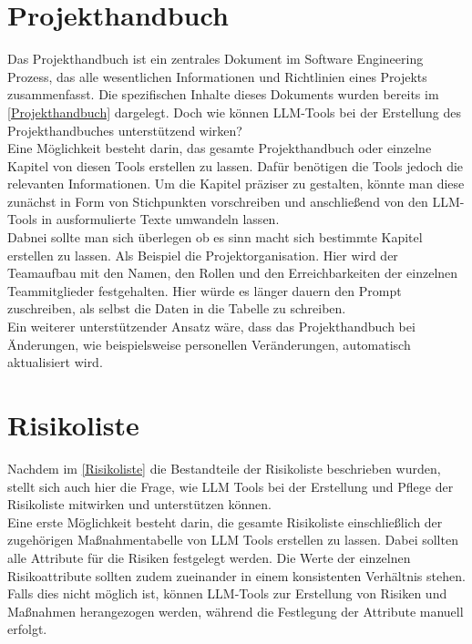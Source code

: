\section{Projekthandbuch}  \label{LLMProjekthandbuch}

Das Projekthandbuch ist ein zentrales Dokument im Software Engineering Prozess, das alle wesentlichen Informationen und 
Richtlinien eines Projekts zusammenfasst. Die spezifischen Inhalte dieses Dokuments wurden bereits im 
\autoref{Projekthandbuch} dargelegt. Doch wie können LLM-Tools bei der Erstellung des 
Projekthandbuches unterstützend wirken?\\

Eine Möglichkeit besteht darin, das gesamte Projekthandbuch oder einzelne Kapitel von diesen Tools erstellen zu 
lassen. Dafür benötigen die Tools jedoch die relevanten Informationen. Um die Kapitel präziser zu gestalten, könnte 
man diese zunächst in Form von Stichpunkten vorschreiben und anschließend von den LLM-Tools in ausformulierte Texte 
umwandeln lassen.\\
Dabnei sollte man sich überlegen ob es sinn macht sich bestimmte Kapitel erstellen zu lassen. Als Beispiel die 
Projektorganisation. Hier wird der Teamaufbau mit den Namen, den Rollen und den Erreichbarkeiten der einzelnen
Teammitglieder festgehalten. Hier würde es länger dauern den Prompt zuschreiben, als selbst die Daten in die 
Tabelle zu schreiben.\\

Ein weiterer unterstützender Ansatz wäre, dass das Projekthandbuch bei Änderungen, wie beispielsweise personellen 
Veränderungen, automatisch aktualisiert wird.

\section{Risikoliste}  \label{LLMRisikoliste}

Nachdem im \autoref{Risikoliste} die Bestandteile der Risikoliste beschrieben wurden, stellt sich auch hier die Frage, 
wie LLM Tools bei der Erstellung und Pflege der Risikoliste mitwirken und unterstützen können.\\

Eine erste Möglichkeit besteht darin, die gesamte Risikoliste einschließlich der zugehörigen Maßnahmentabelle von 
LLM Tools erstellen zu lassen. Dabei sollten alle Attribute für die Risiken festgelegt werden. Die Werte der einzelnen 
Risikoattribute sollten zudem zueinander in einem konsistenten Verhältnis stehen.\\
Falls dies nicht möglich ist, können LLM-Tools zur Erstellung von Risiken und Maßnahmen herangezogen werden, während 
die Festlegung der Attribute manuell erfolgt.\\


